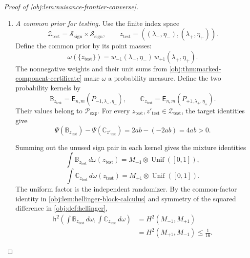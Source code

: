 \begin{proof}[Proof of \cref{obj:lem:nuisance-frontier-converse}]
\begin{enumerate}
We may consequently define a functional on all nonnegative Borel measures on \(\Omega_{\mathrm{obs}}\) by
\[
\Psi(\mathbb P)=
\begin{cases}
\tau_{P_{\theta,\lambda,\eta}}(x_0),
&
\mathbb P=\mathsf E_{n,m}(P_{\theta,\lambda,\eta})
\text{ for some }
\theta\in\{-1,+1\},\
(\lambda,\eta)\in\mathcal S_{\mathrm{sign}},\\
0,&\mathbb P\notin\mathcal P_{\mathrm{exp}}.
\end{cases}
\]
The equality just proved makes the first case independent of the representative. Thus
\[
\Psi\bigl(\mathsf E_{n,m}(P_{\theta,\lambda,\eta})\bigr)
=\tau_{P_{\theta,\lambda,\eta}}(x_0)
\]
throughout the marked family.

\item \textit{A common prior for testing.}
Use the finite index space
\[
\mathcal Z_{\mathrm{test}}
=\mathcal S_{\mathrm{sign}}\times\mathcal S_{\mathrm{sign}},
\qquad
z_{\mathrm{test}}
=((\lambda_-,\eta_-),(\lambda_+,\eta_+)).
\]
Define the common prior by its point masses:
\[
\omega(\{z_{\mathrm{test}}\})
=
w_{-1}(\lambda_-,\eta_-)\,
w_{+1}(\lambda_+,\eta_+).
\]
The nonnegative weights and their unit sums from \cref{obj:thm:marked-component-certificate} make \(\omega\) a probability measure. Define the two probability kernels by
\[
\mathbb B_{z_{\mathrm{test}}}
=\mathsf E_{n,m}(P_{-1,\lambda_-,\eta_-}),
\qquad
\mathbb C_{z_{\mathrm{test}}}
=\mathsf E_{n,m}(P_{+1,\lambda_+,\eta_+}).
\]
Their values belong to \(\mathcal P_{\mathrm{exp}}\). For every
\(z_{\mathrm{test}},z'_{\mathrm{test}}\in\mathcal Z_{\mathrm{test}}\), the target identities give
\[
\Psi(\mathbb B_{z_{\mathrm{test}}})
-\Psi(\mathbb C_{z'_{\mathrm{test}}})
=2ab-(-2ab)=4ab>0.
\]

Summing out the unused sign pair in each kernel gives the mixture identities
\[
\int\mathbb B_{z_{\mathrm{test}}}\,d\omega(z_{\mathrm{test}})
=M_{-1}\otimes\operatorname{Unif}([0,1]),
\]
\[
\int\mathbb C_{z_{\mathrm{test}}}\,d\omega(z_{\mathrm{test}})
=M_{+1}\otimes\operatorname{Unif}([0,1]).
\]
The uniform factor is the independent randomizer. By the common-factor identity in \cref{obj:lem:hellinger-block-calculus} and symmetry of the squared difference in \cref{obj:def:hellinger},
\[
\begin{aligned}
\mathsf h^2\left(
\int\mathbb B_{z_{\mathrm{test}}}\,d\omega,
\int\mathbb C_{z_{\mathrm{test}}}\,d\omega
\right)
&=H^2(M_{-1},M_{+1})\\
&=H^2(M_{+1},M_{-1})
\le\frac1{16}.
\end{aligned}
\]


\end{enumerate}
\end{proof}
